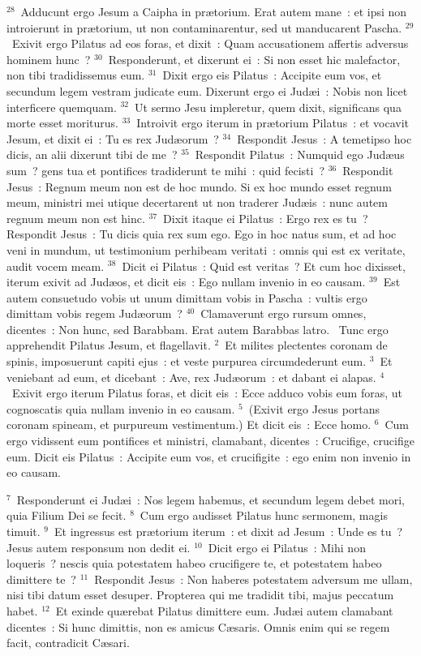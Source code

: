 ${}^{28}$~Adducunt ergo Jesum a Caipha in pr\ae torium. Erat autem mane~: et ipsi non introierunt in pr\ae torium, ut non contaminarentur, sed ut manducarent Pascha.
${}^{29}$~Exivit ergo Pilatus ad eos foras, et dixit~: Quam accusationem affertis adversus hominem hunc~?
${}^{30}$~Responderunt, et dixerunt ei~: Si non esset hic malefactor, non tibi tradidissemus eum.
${}^{31}$~Dixit ergo eis Pilatus~: Accipite eum vos, et secundum legem vestram judicate eum. Dixerunt ergo ei Jud\ae i~: Nobis non licet interficere quemquam.
${}^{32}$~Ut sermo Jesu impleretur, quem dixit, significans qua morte esset moriturus.
${}^{33}$~Introivit ergo iterum in pr\ae torium Pilatus~: et vocavit Jesum, et dixit ei~: Tu es rex Jud\ae orum~?
${}^{34}$~Respondit Jesus~: A temetipso hoc dicis, an alii dixerunt tibi de me~?
${}^{35}$~Respondit Pilatus~: Numquid ego Jud\ae us sum~? gens tua et pontifices tradiderunt te mihi~: quid fecisti~?
${}^{36}$~Respondit Jesus~: Regnum meum non est de hoc mundo. Si ex hoc mundo esset regnum meum, ministri mei utique decertarent ut non traderer Jud\ae is~: nunc autem regnum meum non est hinc.
${}^{37}$~Dixit itaque ei Pilatus~: Ergo rex es tu~? Respondit Jesus~: Tu dicis quia rex sum ego. Ego in hoc natus sum, et ad hoc veni in mundum, ut testimonium perhibeam veritati~: omnis qui est ex veritate, audit vocem meam.
${}^{38}$~Dicit ei Pilatus~: Quid est veritas~? Et cum hoc dixisset, iterum exivit ad Jud\ae os, et dicit eis~: Ego nullam invenio in eo causam.
${}^{39}$~Est autem consuetudo vobis ut unum dimittam vobis in Pascha~: vultis ergo dimittam vobis regem Jud\ae orum~?
${}^{40}$~Clamaverunt ergo rursum omnes, dicentes~: Non hunc, sed Barabbam. Erat autem Barabbas latro.
~\lettrine[lines=10,image=true,loversize=0.05,lraise=-0.03]{T}{}unc ergo apprehendit Pilatus Jesum, et flagellavit.
${}^{2}$~Et milites plectentes coronam de spinis, imposuerunt capiti ejus~: et veste purpurea circumdederunt eum.
${}^{3}$~Et veniebant ad eum, et dicebant~: Ave, rex Jud\ae orum~: et dabant ei alapas.
${}^{4}$~Exivit ergo iterum Pilatus foras, et dicit eis~: Ecce adduco vobis eum foras, ut cognoscatis quia nullam invenio in eo causam.
${}^{5}$~(Exivit ergo Jesus portans coronam spineam, et purpureum vestimentum.) Et dicit eis~: Ecce homo.
${}^{6}$~Cum ergo vidissent eum pontifices et ministri, clamabant, dicentes~: Crucifige, crucifige eum. Dicit eis Pilatus~: Accipite eum vos, et crucifigite~: ego enim non invenio in eo causam.


${}^{7}$~Responderunt ei Jud\ae i~: Nos legem habemus, et secundum legem debet mori, quia Filium Dei se fecit.
${}^{8}$~Cum ergo audisset Pilatus hunc sermonem, magis timuit.
${}^{9}$~Et ingressus est pr\ae torium iterum~: et dixit ad Jesum~: Unde es tu~? Jesus autem responsum non dedit ei.
${}^{10}$~Dicit ergo ei Pilatus~: Mihi non loqueris~? nescis quia potestatem habeo crucifigere te, et potestatem habeo dimittere te~?
${}^{11}$~Respondit Jesus~: Non haberes potestatem adversum me ullam, nisi tibi datum esset desuper. Propterea qui me tradidit tibi, majus peccatum habet.
${}^{12}$~Et exinde qu\ae rebat Pilatus dimittere eum. Jud\ae i autem clamabant dicentes~: Si hunc dimittis, non es amicus C\ae saris. Omnis enim qui se regem facit, contradicit C\ae sari.


